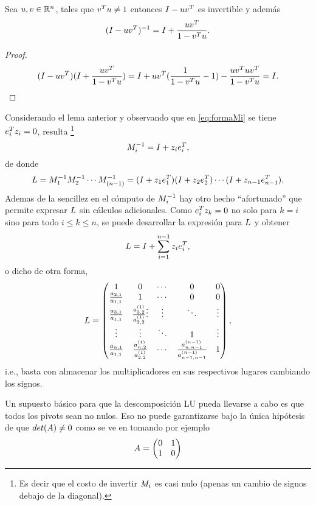 \begin{tcolorbox}[colback=black!15!white,colframe=black!75!black]
\begin{lema}\label{lema:inversamultiplicador}
 Sea $\ub,\vb\in \Rn$, tales que $\vb^T\ub\neq 1$ entonces $\Ib-\ub\vb^T$ es invertible y además
 $$(\Ib-\ub\vb^T)^{-1}=\Ib+\frac{\ub\vb^T}{1-\vb^T\ub}.$$
\end{lema}
\end{tcolorbox}
\begin{proof}
 $$(\Ib-\ub\vb^T)(\Ib+\frac{\ub\vb^T}{1-\vb^T\ub})=\Ib+\ub\vb^T(\frac{1}{1-\vb^T\ub}-1)-\frac{\ub\vb^T\ub\vb^T}{1-\vb^T\ub}=\Ib. $$
\end{proof}
Considerando el lema anterior y observando que en  \eqref{eq:formaMi} se tiene
$\eb_i^T\zb_i=0$, resulta \footnote{Es decir que el costo de invertir $\Mb_i$ es casi nulo (apenas un cambio de signos debajo de la diagonal).}
$$
\Mb_i^{-1}=\Ib+\zb_i\eb_i^T,
$$
de donde
$$
\Lb=\Mb_1^{-1}\Mb_2^{-1}\cdots \Mb_{(n-1)}^{-1}=(\Ib+\zb_1\eb_1^T)(\Ib+\zb_2\eb_2^T)\cdots (\Ib+\zb_{n-1}\eb_{n-1}^T).
$$
Ademas de la sencillez en el cómputo de $\Mb_i^{-1}$ hay otro hecho ``afortunado'' que permite expresar $\Lb$ sin cálculos adicionales. Como $\eb_i^T\zb_k=0$ no solo para $k=i$ sino para todo $i\le k\le n$,  se puede desarrollar la expresión para $\Lb$ y obtener
$$
\Lb=\Ib+\sum_{i=1}^{n-1}\zb_i\eb_i^T,
$$
o dicho de otra forma,
$$
\Lb=
\begin{pmatrix}
1 & 0 & \cdots & 0 & 0\\
\frac{a_{2,1}}{a_{1,1}} & 1 & \cdots & 0 & 0 \\
\frac{a_{3,1}}{a_{1,1}} & \frac{a_{3,2}^{(1)}}{a^{(1)}_{2,2}}
\vdots  & \vdots  & \ddots & \vdots  \\
\vdots  & \vdots  & \ddots &1&  \vdots  \\
\frac{a_{n,1}}{a_{1,1}} &  \frac{a_{n,2}^{(1)}}{a^{(1)}_{2,2}} & \cdots & \frac{a_{n,n-1}^{(n-1)}}{a^{(n-1)}_{n-1,n-1}}& 1
\end{pmatrix},
$$
i.e., basta con almacenar los multiplicadores en sus respectivos lugares cambiando los signos.




Un supuesto básico para que la descomposición LU pueda llevarse a cabo
es que todos los pivots sean no nulos.
Eso no puede garantizarse bajo la única hipótesis de que $det(\Ab)\neq 0$ como se ve en tomando por ejemplo
$$
\Ab=
\begin{pmatrix}
 0&1\\
 1&0
\end{pmatrix}
$$

